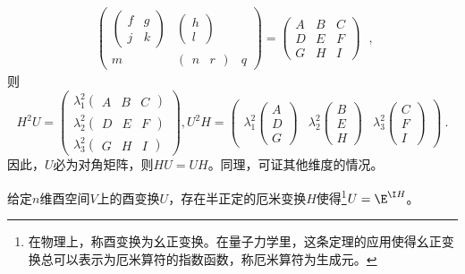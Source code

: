 \begin{equation}
\begin{aligned}
\begin{pmatrix}
\begin{pmatrix}
 f& g\\
  j& k 
\end{pmatrix}  & \begin{pmatrix}
 h\\
l
\end{pmatrix}\\
 m & \begin{pmatrix}
  n&r
\end{pmatrix} &q
\end{pmatrix}=\begin{pmatrix}
  A&  B&C \\
 D & E &F \\
 G &  H& I
\end{pmatrix}
\end{aligned}~,
\end{equation}
则\begin{equation}
H^2U=\begin{pmatrix}
 \lambda^2_1\begin{pmatrix}
 A &B  &C
\end{pmatrix}\\
 \lambda^2_2\begin{pmatrix}
 D &E  &F\end{pmatrix}\\
\lambda^2_3\begin{pmatrix}
 G &H  &I
\end{pmatrix}
\end{pmatrix},
U^2H=\begin{pmatrix}
 \lambda_1^2\begin{pmatrix}
 A\\
 D\\
G
\end{pmatrix} &\lambda_2^2 \begin{pmatrix}
 B\\
 E\\
H
\end{pmatrix} &\lambda_3^2\begin{pmatrix}
 C\\
 F\\
I
\end{pmatrix}
\end{pmatrix}~.
\end{equation}
因此，$U$必为对角矩阵，则$HU=UH$。同理，可证其他维度的情况。
\begin{theorem}{}\label{the_PoDe_3}
给定$n$维酉空间$V$上的酉变换$U$，存在半正定的厄米变换$H$使得\footnote{在物理上，称酉变换为幺正变换。在量子力学里，这条定理的应用使得幺正变换总可以表示为厄米算符的指数函数，称厄米算符为生成元。}$U=\E^{\I H}$。
\end{theorem}

